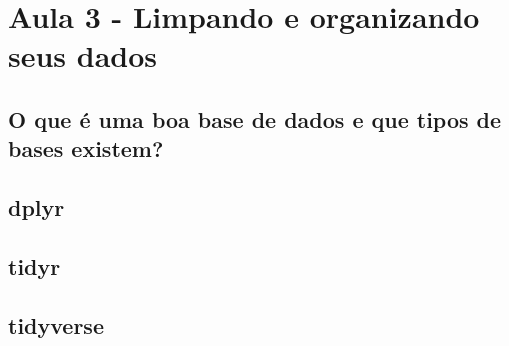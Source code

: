 
\chapter{Aula 3 - Limpando e organizando seus dados}

\section{O que é uma boa base de dados e que tipos de bases existem?}

\section{dplyr}

\section{tidyr}

\section{tidyverse}
